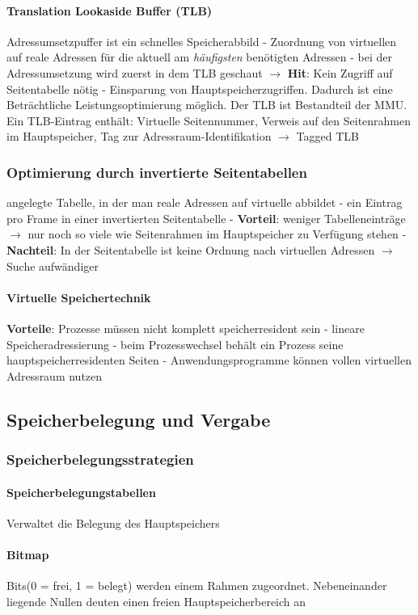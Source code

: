 \documentclass[11pt,a4paper,landscape]{article}
\begin{document}
\begin{multicols*}{3}
	\paragraph{Translation Lookaside Buffer (TLB)} Adressumsetzpuffer ist ein schnelles Speicherabbild - Zuordnung von virtuellen auf reale Adressen für die aktuell am \textit{häufigsten} benötigten Adressen - bei der Adressumsetzung wird zuerst in dem TLB geschaut $\rightarrow$ \textbf{Hit}: Kein Zugriff auf Seitentabelle nötig - Einsparung von Hauptspeicherzugriffen. Dadurch ist eine Beträchtliche Leistungsoptimierung möglich. Der TLB ist Bestandteil der MMU. Ein TLB-Eintrag enthält: Virtuelle Seitennummer, Verweis auf den Seitenrahmen im Hauptspeicher, Tag zur Adressraum-Identifikation $\rightarrow$ Tagged TLB
	\subsubsection{Optimierung durch invertierte Seitentabellen}
	angelegte Tabelle, in der man reale Adressen auf virtuelle abbildet - ein Eintrag pro Frame in einer invertierten Seitentabelle - \textbf{Vorteil}: weniger Tabelleneinträge $\rightarrow$ nur noch so viele wie Seitenrahmen im Hauptspeicher zu Verfügung stehen - \textbf{Nachteil}: In der Seitentabelle ist keine Ordnung nach virtuellen Adressen $\rightarrow$ Suche aufwändiger
	\paragraph{Virtuelle Speichertechnik} \textbf{Vorteile}: Prozesse müssen nicht komplett speicherresident sein - lineare Speicheradressierung - beim Prozesswechsel behält ein Prozess seine hauptspeicherresidenten Seiten - Anwendungsprogramme können vollen virtuellen Adressraum nutzen
	
	\subsection{Speicherbelegung und Vergabe}
	\subsubsection{Speicherbelegungsstrategien}
	\paragraph{Speicherbelegungstabellen} Verwaltet die Belegung des Hauptspeichers
	\paragraph{Bitmap} Bits(0 = frei, 1 = belegt) werden einem Rahmen zugeordnet. Nebeneinander liegende Nullen deuten einen freien Hauptspeicherbereich an

\end{multicols*}
\end{document}
